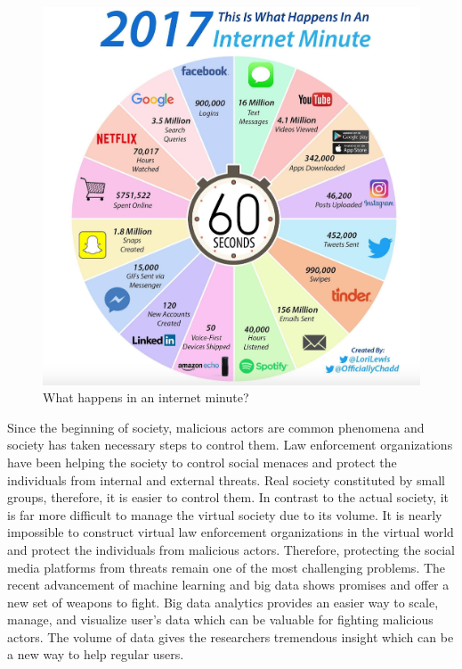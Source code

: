 \documentclass[sigconf]{acmart}
\begin{document}
\begin{figure}[!ht]
 \centering\includegraphics[width=1.0\columnwidth]{images/one-internet-minute.png}
  \caption{What happens in an internet minute?~\cite{social-media2}}\label{f:socialmedia}
\end{figure}

Since the beginning of society, malicious actors are common phenomena and society has taken necessary steps to control them. Law enforcement organizations have been helping the society to control social menaces and protect the individuals from internal and external threats.  Real society constituted by small groups, therefore, it is easier to control them. In contrast to the actual society, it is far more difficult to manage the virtual society due to its volume. It is nearly impossible to construct virtual law enforcement organizations in the virtual world and protect the individuals from malicious actors. Therefore, protecting the social media platforms from threats remain one of the most challenging problems. The recent advancement of machine learning and big data shows promises and offer a new set of weapons to fight. Big data analytics provides an easier way to scale, manage, and visualize user's data which can be valuable for fighting malicious actors. The volume of data gives the researchers tremendous insight which can be a new way to help regular users. 
\end{document}
